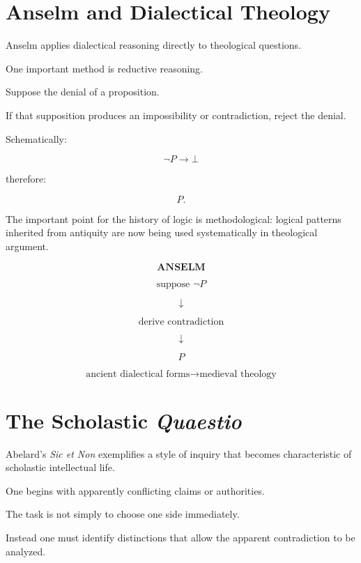 \documentclass[11pt]{article}
\begin{document}
\section{Anselm and Dialectical Theology}

Anselm applies dialectical reasoning directly to theological
questions.

One important method is reductive reasoning.

Suppose the denial of a proposition.

If that supposition produces an impossibility or contradiction,
reject the denial.

Schematically:

\[
\neg P \rightarrow \bot
\]

therefore:

\[
P.
\]

The important point for the history of logic is methodological:
logical patterns inherited from antiquity are now being used
systematically in theological argument.

\begin{whiteboard}
\[
\textbf{ANSELM}
\]

\[
\text{suppose }\neg P
\]

\[
\downarrow
\]

\[
\text{derive contradiction}
\]

\[
\downarrow
\]

\[
\boxed{P}
\]

\[
\text{ancient dialectical forms}
\rightarrow
\text{medieval theology}
\]
\end{whiteboard}

\section{The Scholastic \textit{Quaestio}}

Abelard's \textit{Sic et Non} exemplifies a style of inquiry that
becomes characteristic of scholastic intellectual life.

One begins with apparently conflicting claims or authorities.

The task is not simply to choose one side immediately.

Instead one must identify distinctions that allow the apparent
contradiction to be analyzed.
\end{document}
